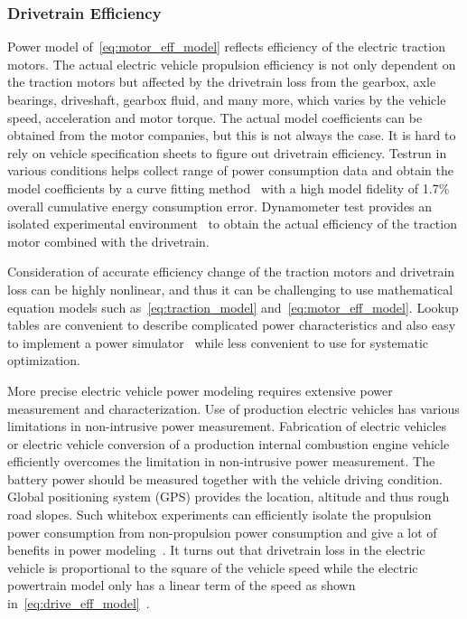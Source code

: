 \subsubsection{Drivetrain Efficiency} \label{subsubsec:drive_eff}

Power model of~\eqref{eq:motor_eff_model} reflects efficiency of the electric traction motors. The actual electric vehicle propulsion efficiency is not only dependent on the traction motors but affected by the drivetrain loss from the gearbox, axle bearings, driveshaft, gearbox fluid, and many more, which varies by the vehicle speed, acceleration and motor torque. The actual model coefficients can be obtained from the motor companies, but this is not always the case.
It is hard to rely on vehicle specification sheets to figure out drivetrain efficiency. Testrun in various conditions helps collect range of power consumption data and obtain the model coefficients by a curve fitting method~\cite{Dib:OGST12} with a high model fidelity of 1.7\% overall cumulative energy consumption error\cite{Dib:OGST12}. Dynamometer test provides an isolated experimental environment~\cite{Schwickart:JFI15} to obtain the actual efficiency of the traction motor combined with the drivetrain.

Consideration of accurate efficiency change of the traction motors and drivetrain loss can be highly nonlinear, and thus it can be challenging to use mathematical equation models such as~\eqref{eq:traction_model} and~\eqref{eq:motor_eff_model}. Lookup tables are convenient to describe complicated power characteristics and also easy to implement a power simulator~\cite{Schwickart:JFI15} while less convenient to use for systematic optimization.

More precise electric vehicle power modeling requires extensive power measurement and characterization. Use of production electric vehicles has various limitations in non-intrusive power measurement. Fabrication of electric vehicles~\cite{Hong:ASPDAC16} or electric vehicle conversion of a production internal combustion engine vehicle~\cite{Wu:TR15} efficiently overcomes the limitation in non-intrusive power measurement. The battery power should be measured together with the vehicle driving condition. Global positioning system (GPS) provides the location, altitude and thus rough road slopes. Such whitebox experiments can efficiently isolate the propulsion power consumption from non-propulsion power consumption and give a lot of benefits in power modeling~\cite{Hong:ASPDAC16,Wu:TR15}. It turns out that drivetrain loss in the electric vehicle is proportional to the square of the vehicle speed while the electric powertrain model only has a linear term of the speed as shown in~\eqref{eq:drive_eff_model}~\cite{Hong:ASPDAC16}.

